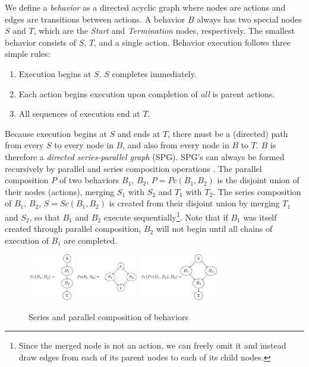 \documentclass[conference]{IEEEtran}
\theoremstyle{definition}
\begin{document}
We define a \textit{behavior} as a directed acyclic graph where nodes are actions and
edges are transitions between actions.  A behavior \(B\) always has two
special nodes \(S\) and \(T\), which are the \textit{Start} and \textit{Termination} nodes, respectively.
The smallest behavior consists of \(S\), \(T\), and a single action.  Behavior execution follows three simple rules:

\begin{enumerate}
\item Execution begins at \(S\).  \(S\) completes immediately.
\item Each action begins execution upon completion of \textit{all} is parent actions.
\item All sequences of execution end at \(T\).
\end{enumerate}

Because execution begins at \(S\) and ends at \(T\), there must be a
(directed) path from every \(S\) to every node in \(B\), and also from every node in \(B\)
to \(T\).  \(B\) is therefore a \textit{directed series-parallel graph} (SPG). SPG's
can always be formed recursively by parallel and series composition operations \cite{SPG}. The
parallel composition \(P\) of two behaviors \(B_1\), \(B_2\), \(P = Pc(B_1, B_2)\)
is the disjoint
union of their nodes (actions), merging \(S_1\) with \(S_2\) and \(T_1\) with \(T_2\). The series
composition of \(B_1\), \(B_2\), \(S = Sc(B_1, B_2)\) is created from their disjoint union by
merging \(T_1\) and \(S_2\), so that \(B_1\) and \(B_2\) execute sequentially\footnote{Since
the merged node is not an action, we can freely omit it and instead draw edges
from each of its parent nodes to each of its child nodes.}.  Note that if \(B_1\) was
itself created through parallel composition, \(B_2\) will not begin until all chains
of execution of \(B_1\) are completed.

\begin{figure}
\begin{center}
\includegraphics[height=0.8in]{images/tikz/series.pdf}
\includegraphics[height=0.8in]{images/tikz/parallel.pdf} \vspace{0.in}
\includegraphics[height=0.8in]{images/tikz/parallel-and-series.pdf}
\end{center}
\caption{Series and parallel composition of behaviors }
\label{fig:graph-composition}
\end{figure}
\end{document}
